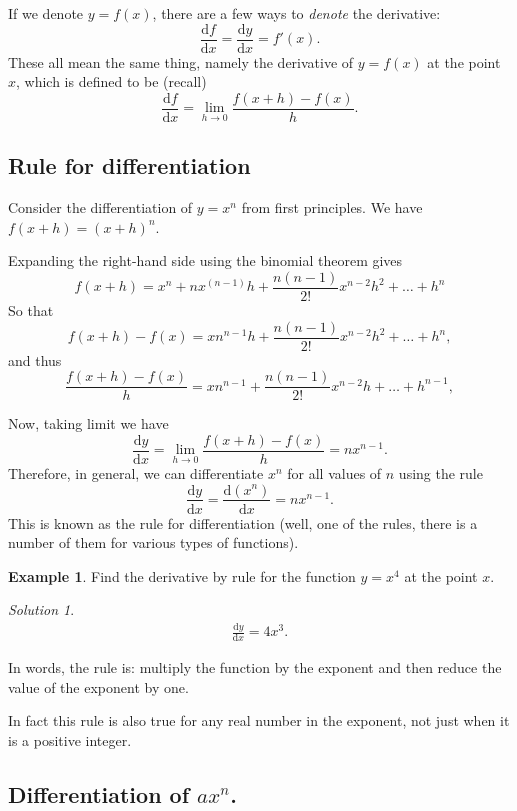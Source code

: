 \documentclass[
  english,
  11pt,
  oneside]{book}
\newcommand{\slide}{}
\theoremstyle{definition}
\theoremstyle{definition}
\newtheorem{example}{Example}[chapter]
\theoremstyle{definition}
\theoremstyle{definition}
\theoremstyle{remark}
\newtheorem*{solution}{Solution}
\begin{document}
If we denote \(y = f(x)\), there are a few ways to \emph{denote} the derivative:
\[
\frac{\mathrm{d} f}{\mathrm{d} x} = \frac{\mathrm{d} y}{\mathrm{d} x} = f'(x).
\]
These all mean the same thing, namely the derivative of \(y=f(x)\) at the point \(x\), which is defined to be (recall)
\[
\frac{\mathrm{d} f}{\mathrm{d} x} = \lim\limits_{h\to0}\frac{f(x+h)-f(x)}{h}.
\]

\slide

\subsection{Rule for differentiation}\label{rule-for-differentiation}

Consider the differentiation of \(y = x^n\) from first principles. We have \(f(x+h) = (x + h)^n\).

Expanding the right-hand side using the binomial theorem gives
\[
f(x+h) = x^n + nx^{(n-1)}h+\frac{n(n-1)}{2!}x^{n-2}h^2+\ldots+h^n
\]
So that
\[
f(x+h)-f(x) = xn^{n-1}h+\frac{n(n-1)}{2!}x^{n-2}h^2+\ldots + h^n,
\]
and thus
\[
\frac{f(x+h)-f(x)}{h} = xn^{n-1}+\frac{n(n-1)}{2!}x^{n-2}h+\ldots + h^{n-1},
\]
\slide
Now, taking limit we have
\[
\frac{\mathrm{d} y}{\mathrm{d} x} = \lim\limits_{h\to0}\frac{f(x+h)-f(x)}{h} = nx^{n-1}.
\]
Therefore, in general, we can differentiate \(x^n\) for all values of \(n\) using the rule
\[
\frac{\mathrm{d} y}{\mathrm{d} x} = \frac{\mathrm{d} (x^n)}{\mathrm{d} x} = nx^{n-1}.
\]
This is known as the rule for differentiation (well, one of the rules, there is a number of them for various types of functions).
\slide

\begin{example}
Find the derivative by rule for the function \(y = x^4\) at the point \(x\).
\end{example}

\begin{solution}
\begin{gather*}
\frac{\mathrm{d} y}{\mathrm{d} x} = 4x^3.
\end{gather*}
\end{solution}

In words, the rule is: multiply the function by the exponent and then reduce the value of the exponent by one.

In fact this rule is also true for any real number in the exponent, not just when it is a positive integer.

\slide

\subsection{\texorpdfstring{Differentiation of \(ax^n\).}{Differentiation of ax\^{}n.}}\label{differentiation-of-axn.}
\end{document}
